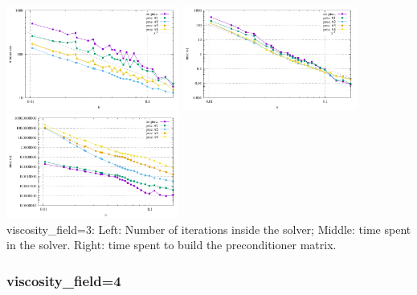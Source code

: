 \begin{center} 
\includegraphics[width=5.7cm]{python_codes/fieldstone_16/results/visc_field_3/niterations.pdf}
\includegraphics[width=5.7cm]{python_codes/fieldstone_16/results/visc_field_3/solve_time.pdf}
\includegraphics[width=5.7cm]{python_codes/fieldstone_16/results/visc_field_3/build_precond.pdf}\\
{\captionfont viscosity\_field=3: Left: Number of iterations inside the solver; 
Middle: time spent in the solver.
Right: time spent to build the preconditioner matrix.}
\end{center} 





\newpage
\subsubsection{viscosity\_field=4}

